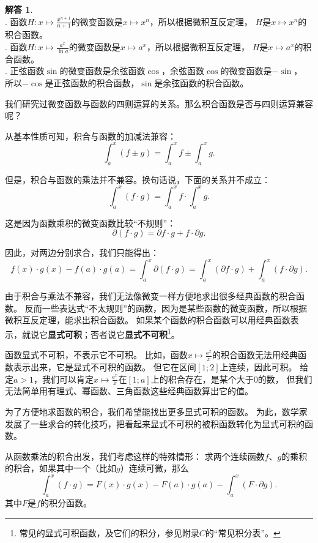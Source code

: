 \documentclass[12pt,UTF8]{ctexbook}
\theoremstyle{definition}
\newtheorem*{so}{解答}
\theoremstyle{plain}
\begin{document}
\begin{so}
    \mbox{} \\
    . 函数$H: x\mapsto \frac{x^{n+1}}{n+1}$的微变函数是$x\mapsto x^n$，所以根据微积互反定理，
    $H$是$x\mapsto x^n$的积合函数。\\
    . 函数$H: x\mapsto \frac{a^x}{\ln{a}}$的微变函数是$x\mapsto a^x$，所以根据微积互反定理，
    $H$是$x\mapsto a^x$的积合函数。\\
    . 正弦函数$\sin$的微变函数是余弦函数$\cos$，余弦函数$\cos$的微变函数是$-\sin$，
    所以$-\cos$是正弦函数的积合函数，$\sin$是余弦函数的积合函数。
\end{so}

我们研究过微变函数与函数的四则运算的关系。那么积合函数是否与四则运算兼容呢？

从基本性质可知，积合与函数的加减法兼容：
$$ \int_a^x (f \pm g) = \int_a^x f \pm \int_a^x g. $$

但是，积合与函数的乘法并不兼容。换句话说，下面的关系并不成立：
$$ \int_a^x (f \cdot g) = \int_a^x f \cdot \int_a^x g. $$

这是因为函数乘积的微变函数比较“不规则”：
$$ \partial (f\cdot g) = \partial f \cdot g + f \cdot \partial g.$$

因此，对两边分别求合，我们只能得出：
$$ f(x)\cdot g(x) - f(a)\cdot g(a) = \int_a^x \partial (f\cdot g) = \int_a^x (\partial f \cdot g) + \int_a^x (f \cdot \partial g). $$

由于积合与乘法不兼容，我们无法像微变一样方便地求出很多经典函数的积合函数。
反而一些表达式“不太规则”的函数，因为是某些函数的微变函数，所以根据微积互反定理，能求出积合函数。
如果某个函数的积合函数可以用经典函数表示，就说它\textbf{显式可积}；否者说它\textbf{显式不可积}\footnote{常见的显式可积函数，及它们的积分，参见附录$C$的“常见积分表”。}。

函数显式不可积，不表示它不可积。
比如，函数$x\mapsto \frac{\mathrm{e}^x}{x}$的积合函数无法用经典函数表示出来，它是显式不可积的函数。
但它在区间$[1;2]$上连续，因此可积。
给定$a>1$，我们可以肯定$x\mapsto \frac{\mathrm{e}^x}{x}$在$[1; a]$上的积合存在，是某个大于$0$的数，
但我们无法简单用有理式、幂函数、三角函数这些经典函数算出它的值。

为了方便地求函数的积合，我们希望能找出更多显式可积的函数。
为此，数学家发展了一些求合的转化技巧，把看起来显式不可积的被积函数转化为显式可积的函数。

从函数乘法的积合出发，我们考虑这样的特殊情形：
求两个连续函数$f$、$g$的乘积的积合，如果其中一个（比如$g$）连续可微，那么
$$ \int_a^x (f \cdot g) = F(x)\cdot g(x) - F(a)\cdot g(a) - \int_a^x (F \cdot \partial g). $$
其中$F$是$f$的积分函数。
\end{document}
